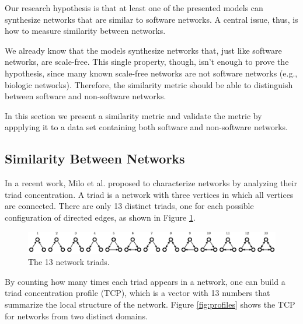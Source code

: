 Our research hypothesis is that at least one of the presented models can
synthesize networks that are similar to software networks. A central issue,
thus, is how to measure similarity between networks.

We already know that the models synthesize networks that, just like software
networks, are scale-free. This single property, though, isn't enough to prove
the hypothesis, since many known scale-free networks are not software networks
(e.g., biologic networks). Therefore, the similarity metric should be able to
distinguish between software and non-software networks.

In this section we present a similarity metric and validate the metric by
appplying it to a data set containing both software and non-software networks. 

\subsection{Similarity Between Networks}

In a recent work, Milo et al. \cite{Milo2002} proposed to characterize networks
by analyzing their triad concentration. A triad is a network with three vertices
in which all vertices are connected. There are only 13 distinct triads, one for
each possible configuration of directed edges, as shown in Figure
\ref{fig:triads}.

\begin{figure}[!t]
\centering
\includegraphics[width=1.0\textwidth]{triads}
\caption{The 13 network triads.}
\label{fig:triads}
\end{figure}

By counting how many times each triad appears in a network, one can build a
triad concentration profile (TCP), which is a vector with 13 numbers that
summarize the local structure of the network. Figure \ref{fig:profiles} shows
the TCP for networks from two distinct domains.

